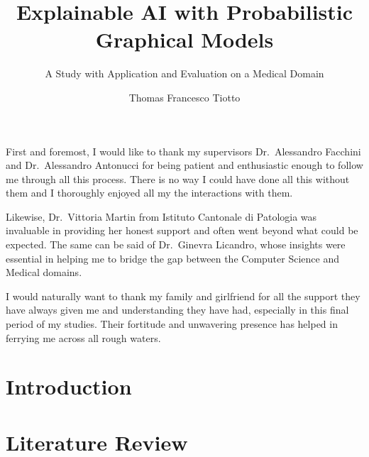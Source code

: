 \documentclass[mscthesis]{usiinfthesis}
\title{Explainable AI with Probabilistic Graphical Models} %
\subtitle{A Study with Application and Evaluation on a Medical Domain} %
\author{Thomas Francesco Tiotto} %
\begin{document}
\maketitle %

\frontmatter %

\begin{abstract}

\end{abstract}

\begin{acknowledgements}
First and foremost, I would like to thank my supervisors Dr.\ Alessandro Facchini and Dr.\ Alessandro Antonucci for being patient and enthusiastic enough to follow me through all this process.
There is no way I could have done all this without them and I thoroughly enjoyed all my the interactions with them.

Likewise, Dr.\ Vittoria Martin from Istituto Cantonale di Patologia was invaluable in providing her honest support and often went beyond what could be expected.
The same can be said of Dr.\ Ginevra Licandro, whose insights were essential in helping me to bridge the gap between the Computer Science and Medical domains.

I would naturally want to thank my family and girlfriend for all the support they have always given me and understanding they have had, especially in this final period of my studies.
Their fortitude and unwavering presence has helped in ferrying me across all rough waters.
\end{acknowledgements}

\tableofcontents 
\listoffigures %
\listoftables %

\mainmatter

\chapter{Introduction}\label{chap:introduction}



 
\chapter{Literature Review}\label{chap:literature-review}




\end{document}
